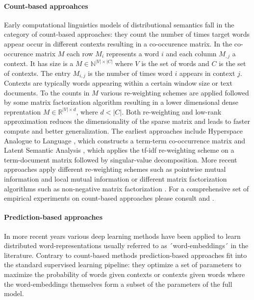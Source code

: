 \paragraph{Count-based approahces}
Early computational linguistics models of distributional semantics fall in the category of
count-based approaches: they count the number of times target words appear occur in different
contexts resulting in a co-occurence matrix. In the co-occurence matrix
$M$ each row $M_i$ represents a word $i$ and each column $M_{,j}$ a context. It has size
is a $M \in \mathbb{N}^{|V| \times |C|}$ where $V$ is the set of words and $C$ is
the set of contexts.
The entry $M_{i,j}$ is the number of times word $i$ appears in context $j$.
Contexts are typically words appearing within a certain window size or text documents.
To the counts in $M$ various re-weighting schemes are applied followed by some matrix factorization algorithm
resulting in a lower dimensional dense reprentation $M \in \mathbb{R}^{|V| \times d}$, where $d < |C|$.
Both re-weighting and low-rank approximation reduces the dimensionality of the sparse matrix and leads
to faster compute and better generalization.
The earliest approaches include Hyperspace Analogue to Language \cite{lund1996producing},
which constructs a term-term co-occurrence matrix and Latent Semantic Analysis \cite{dumais2004latent},
which applies the tf-idf re-weighting scheme on a term-document matrix followed by singular-value decomposition.
More recent approaches apply different re-weighting schemes such as pointwise mutual information and local mutual
information \cite{evert2005statistics} or different matrix factorization algorithms such as non-negative
matrix factorization \cite{baroni2014don}. For a comprehensive set of empirical experiments on count-based
approaches please consult \cite{bullinaria2007extracting} and \cite{bullinaria2012extracting}.

\paragraph{Prediction-based approaches}
In more recent years
various deep learning methods have been applied to learn distributed word-representations usually referred to
as ´word-embeddings´ in the literature. Contrary to count-based methods prediction-based approaches fit into the
standard supervised learning pipeline: they optimize a set of parameters to maximize the probability of words
given contexts or contexts given words where the word-embeddings themselves form a subset of the parameters
of the full model.

